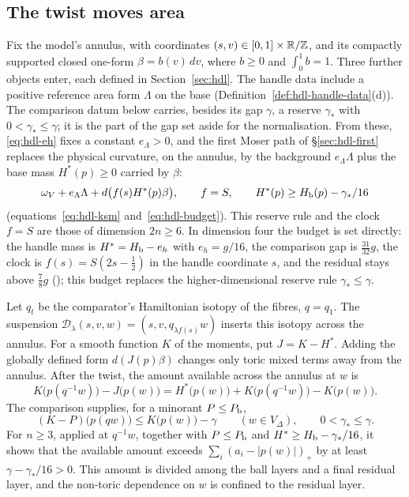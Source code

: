 \subsection{The twist moves area}\label{sec:mech-twist}

Fix the model's annulus, with coordinates $(s,v)\in[0,1]\times\mathbb{R}/\mathbb{Z}$, and its compactly supported
closed one-form $\beta=b(v)\,dv$, where $b\ge0$ and $\int_0^1b=1$. Three further objects enter, each defined
in Section~\ref{sec:hdl}. The handle data include a positive reference area form $\Lambda$ on the base
(Definition~\ref{def:hdl-handle-data}(d)). The comparison datum below carries, besides its gap $\gamma$, a
reserve $\gamma_*$ with $0<\gamma_*\le\gamma$; it is the part of the gap set aside for the normalisation.
From these, \eqref{eq:hdl-eh} fixes a constant $e_\Lambda>0$, and the first Moser path of \S\ref{sec:hdl-first}
replaces the physical curvature, on the annulus, by the background $e_\Lambda\Lambda$ plus the base mass $H^*(p)\ge0$
carried by $\beta$:
\[
 \omega_V+e_\Lambda\Lambda+d\big(f(s)H^*(p)\beta\big),\qquad f=S,\qquad H^*(p)\ge H_{\mathrm b}(p)-\gamma_*/16
\]
(equations~\eqref{eq:hdl-ksm} and~\eqref{eq:hdl-budget}). This reserve rule and the clock $f=S$ are those of
dimension $2n\ge6$. In dimension four the budget is set directly: the handle mass is $H^*=H_{\mathrm b}-e_h$ with
$e_h=g/16$, the comparison gap is $\frac{31}{32}g$, the clock is $f(s)=S(2s-\frac12)$ in the handle coordinate $s$,
and the residual stays above $\frac78g$ (); this budget replaces the
higher-dimensional reserve rule $\gamma_*\le\gamma$.

Let $q_t$ be the comparator's Hamiltonian isotopy of the fibres, $q=q_1$. The suspension
$\mathcal D_\lambda(s,v,w)=(s,v,q_{\lambda f(s)}w)$ inserts this isotopy across the annulus.
For a smooth function $K$ of the moments, put $J=K-H^*$. Adding the globally defined form
$d(J(p)\beta)$ changes only toric mixed terms away from the annulus. After the twist, the amount
available across the annulus at $w$ is
\begin{equation}\label{eq:mech-available}
 K\big(p(q^{-1}w)\big)-J\big(p(w)\big)
 =H^*\big(p(w)\big)+K\big(p(q^{-1}w)\big)-K\big(p(w)\big).
\end{equation}
The comparison supplies, for a minorant $P\le P_{\mathrm b}$,
\begin{equation}\label{eq:mech-comparison}
 (K-P)\big(p(qw)\big)\le K\big(p(w)\big)-\gamma\qquad(w\in V_\Delta),
 \qquad 0<\gamma_*\le\gamma.
\end{equation}
For $n\ge3$, applied at $q^{-1}w$, together with $P\le P_{\mathrm b}$ and $H^*\ge H_{\mathrm b}-\gamma_*/16$, it shows that the available amount
exceeds $\sum_i(a_i-|p(w)|)_+$ by at least $\gamma-\gamma_*/16>0$. This amount is divided among the ball layers and a
final residual layer, and the non-toric dependence on $w$ is confined to the residual layer.

